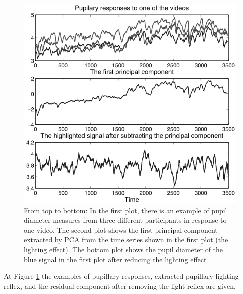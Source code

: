 \documentclass[10pt,journal,compsoc,twoside]{IEEEtran}
\newcommand{\Ref}[2]{#2 \ref{#1}}
\begin{document}
\begin{figure}[ht]
	\centering
	\includegraphics[width=1.0\linewidth]{pupilDiameter2}
	\caption{
		From top to bottom: In the first plot, there is an example of pupil diameter measures from three different participants in response to one video. The second plot shows the first principal component extracted by PCA from the time series shown in the first plot (the lighting effect). The bottom plot shows the pupil diameter of the blue signal in the first plot after reducing the lighting effect\cite{SoleymaniPanticPun2002}}
	\label{fig:pupilDiameter2}
\end{figure}

At \Ref{fig:pupilDiameter2}{Figure} the examples of pupillary responses, extracted pupillary lighting reflex, and the residual component after removing the light reflex are given.
\end{document}
